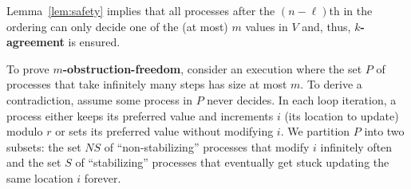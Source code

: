 \documentclass[11pt]{article}
\newcommand{\journalversion}[1]{}
\begin{document}
Lemma~\ref{lem:safety} implies that all processes after the $(n-\ell)$th in the ordering can only decide one of the (at most) $m$ values in $V$ and, thus, {\bf $k$-agreement} is ensured. 

To prove {\bf $m$-obstruction-freedom}, consider an execution where
the set $P$ of processes that take infinitely many steps has size at most $m$.
To derive a  contradiction, assume some process in $P$ never decides.
In each  loop iteration, a process either
keeps its preferred value and increments $i$ (its location to
update) modulo $r$ or sets its preferred value without modifying  $i$. 
We partition $P$ into two subsets: the set $NS$
of ``non-stabilizing'' processes that modify  $i$ 
infinitely often and
the set $S$ of  ``stabilizing'' processes that eventually get stuck 
updating the same location $i$ forever.
\journalversion{Every process in $NS$ updates each component of $A$
infinitely often, and there is a time after which each process in
$S$, whenever it executes the loop, changes its preferred
value and stores it in the same location.
}
\end{document}
